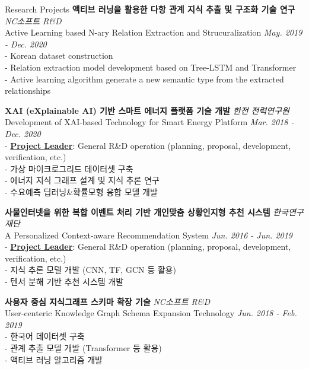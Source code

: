 \documentclass{resume} %
\newcommand{\me}[1]{\underline{\textbf{#1}}}  %
\begin{document}
\begin{rSection}{Research Projects}
		\textbf{액티브 러닝을 활용한 다항 관계 지식 추출 및 구조화 기술 연구} \hfill {\small\em NC소프트 R\&D}\\
		{\small Active Learning based N-ary Relation Extraction and Strucuralization} \hfill {\small\em May. 2019 - Dec. 2020}
		\vspace{0.1em}\\
		- Korean dataset construction\\
		- Relation extraction model development based on Tree-LSTM and Transformer\\
		- Active learning algorithm generate a new semantic type from the extracted relationships
		\vspace{0.2em}
		
		\textbf{XAI (eXplainable AI) 기반 스마트 에너지 플랫폼 기술 개발} \hfill {\small\em 한전 전력연구원}\\
		{\small Development of XAI-based Technology for Smart Energy Platform} \hfill {\small\em Mar. 2018 - Dec. 2020}
		\vspace{0.1em}\\
		- \me{Project Leader}: General R\&D operation (planning, proposal, development, verification, etc.)\\
		- 가상 마이크로그리드 데이터셋 구축\\
		- 에너지 지식 그래프 설계 및 지식 추론 연구\\
		- 수요예측 딥러닝\&확률모형 융합 모델 개발
		\vspace{0.2em}
		
		\textbf{사물인터넷을 위한 복합 이벤트 처리 기반 개인맞춤 상황인지형 추천 시스템} \hfill {\small\em 한국연구재단}\\
		{\small A Personalized Context-aware Recommendation System} \hfill {\small\em Jun. 2016 - Jun. 2019}
		\vspace{0.1em}\\
		- \me{Project Leader}: General R\&D operation (planning, proposal, development, verification, etc.)\\
		- 지식 추론 모델 개발 (CNN, TF, GCN 등 활용)\\
		- 텐서 분해 기반 추천 시스템 개발
		\vspace{0.2em}
		
		\textbf{사용자 중심 지식그래프 스키마 확장 기술} \hfill {\small\em NC소프트 R\&D}\\
		{\small User-centeric Knowledge Graph Schema Expansion Technology} \hfill {\small\em Jun. 2018 - Feb. 2019}
		\vspace{0.1em}\\
		- 한국어 데이터셋 구축\\
		- 관계 추출 모델 개발 (Transformer 등 활용)\\
		- 액티브 러닝 알고리즘 개발
		\vspace{0.2em}
		

\end{rSection}
\end{document}
